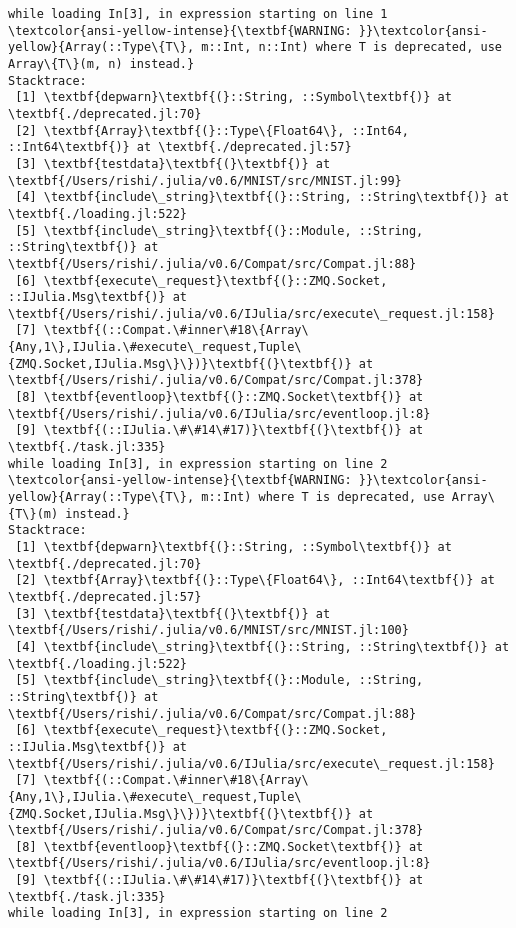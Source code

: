 \documentclass[11pt]{article}
\begin{document}
\begin{Verbatim}[commandchars=\\\{\}]
while loading In[3], in expression starting on line 1
\textcolor{ansi-yellow-intense}{\textbf{WARNING: }}\textcolor{ansi-yellow}{Array(::Type\{T\}, m::Int, n::Int) where T is deprecated, use Array\{T\}(m, n) instead.}
Stacktrace:
 [1] \textbf{depwarn}\textbf{(}::String, ::Symbol\textbf{)} at \textbf{./deprecated.jl:70}
 [2] \textbf{Array}\textbf{(}::Type\{Float64\}, ::Int64, ::Int64\textbf{)} at \textbf{./deprecated.jl:57}
 [3] \textbf{testdata}\textbf{(}\textbf{)} at \textbf{/Users/rishi/.julia/v0.6/MNIST/src/MNIST.jl:99}
 [4] \textbf{include\_string}\textbf{(}::String, ::String\textbf{)} at \textbf{./loading.jl:522}
 [5] \textbf{include\_string}\textbf{(}::Module, ::String, ::String\textbf{)} at \textbf{/Users/rishi/.julia/v0.6/Compat/src/Compat.jl:88}
 [6] \textbf{execute\_request}\textbf{(}::ZMQ.Socket, ::IJulia.Msg\textbf{)} at \textbf{/Users/rishi/.julia/v0.6/IJulia/src/execute\_request.jl:158}
 [7] \textbf{(::Compat.\#inner\#18\{Array\{Any,1\},IJulia.\#execute\_request,Tuple\{ZMQ.Socket,IJulia.Msg\}\})}\textbf{(}\textbf{)} at \textbf{/Users/rishi/.julia/v0.6/Compat/src/Compat.jl:378}
 [8] \textbf{eventloop}\textbf{(}::ZMQ.Socket\textbf{)} at \textbf{/Users/rishi/.julia/v0.6/IJulia/src/eventloop.jl:8}
 [9] \textbf{(::IJulia.\#\#14\#17)}\textbf{(}\textbf{)} at \textbf{./task.jl:335}
while loading In[3], in expression starting on line 2
\textcolor{ansi-yellow-intense}{\textbf{WARNING: }}\textcolor{ansi-yellow}{Array(::Type\{T\}, m::Int) where T is deprecated, use Array\{T\}(m) instead.}
Stacktrace:
 [1] \textbf{depwarn}\textbf{(}::String, ::Symbol\textbf{)} at \textbf{./deprecated.jl:70}
 [2] \textbf{Array}\textbf{(}::Type\{Float64\}, ::Int64\textbf{)} at \textbf{./deprecated.jl:57}
 [3] \textbf{testdata}\textbf{(}\textbf{)} at \textbf{/Users/rishi/.julia/v0.6/MNIST/src/MNIST.jl:100}
 [4] \textbf{include\_string}\textbf{(}::String, ::String\textbf{)} at \textbf{./loading.jl:522}
 [5] \textbf{include\_string}\textbf{(}::Module, ::String, ::String\textbf{)} at \textbf{/Users/rishi/.julia/v0.6/Compat/src/Compat.jl:88}
 [6] \textbf{execute\_request}\textbf{(}::ZMQ.Socket, ::IJulia.Msg\textbf{)} at \textbf{/Users/rishi/.julia/v0.6/IJulia/src/execute\_request.jl:158}
 [7] \textbf{(::Compat.\#inner\#18\{Array\{Any,1\},IJulia.\#execute\_request,Tuple\{ZMQ.Socket,IJulia.Msg\}\})}\textbf{(}\textbf{)} at \textbf{/Users/rishi/.julia/v0.6/Compat/src/Compat.jl:378}
 [8] \textbf{eventloop}\textbf{(}::ZMQ.Socket\textbf{)} at \textbf{/Users/rishi/.julia/v0.6/IJulia/src/eventloop.jl:8}
 [9] \textbf{(::IJulia.\#\#14\#17)}\textbf{(}\textbf{)} at \textbf{./task.jl:335}
while loading In[3], in expression starting on line 2

    \end{Verbatim}
\end{document}
